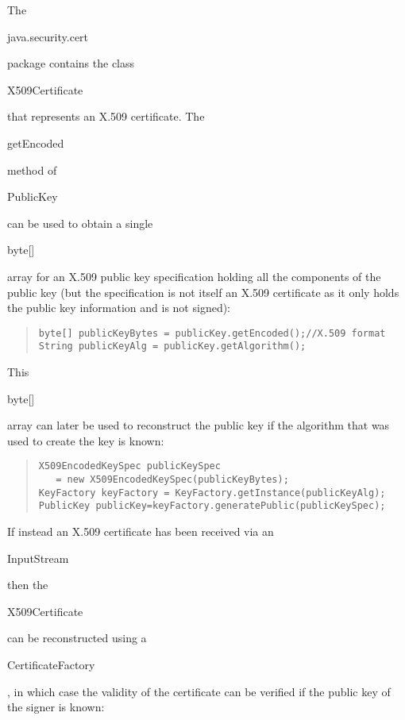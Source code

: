 The \begin{code}java.security.cert\end{code} package contains the class
\begin{code}X509Certificate\end{code} that represents an X.509 certificate.
The \begin{code}getEncoded\end{code} method of \begin{code}PublicKey\end{code}
can be used to obtain a single \begin{code}byte[]\end{code} array for an X.509 public key
specification holding all the components of the public key (but the specification is not
itself an X.509 certificate as it only holds the public key information and is not signed):
\begin{quote}\begin{code}\begin{verbatim}
byte[] publicKeyBytes = publicKey.getEncoded();//X.509 format
String publicKeyAlg = publicKey.getAlgorithm();
\end{verbatim}\end{code}\end{quote}
This \begin{code}byte[]\end{code} array can later be used to reconstruct the public key
if the algorithm that was used to create the key is known:
\begin{quote}\begin{code}\begin{verbatim}
X509EncodedKeySpec publicKeySpec
   = new X509EncodedKeySpec(publicKeyBytes);
KeyFactory keyFactory = KeyFactory.getInstance(publicKeyAlg);
PublicKey publicKey=keyFactory.generatePublic(publicKeySpec);
\end{verbatim}\end{code}\end{quote}
If instead an X.509 certificate has been received via an \begin{code}InputStream\end{code}
then the \begin{code}X509Certificate\end{code} can be reconstructed
using a \begin{code}CertificateFactory\end{code}, in which
case the validity of the certificate can be verified if the public key of the signer is known:
